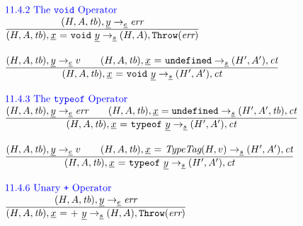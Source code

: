 \documentclass[a4paper, leqno]{amsart}
\newcommand{\rulesep}{\quad\quad}
\newcommand{\stmt}{s}
\newcommand{\expr}{e}
\newcommand{\ir}[1]{\ensuremath{\underline{#1}}}
\newcommand{\irid}{\ir{x}}
\def\inblue{\color{blue}}
\newcommand{\undef}{{\tt undefined}}
\newcommand{\tb}{\emph{tb}}
\newcommand{\err}{\emph{err}}
\newcommand{\ct}{\emph{ct}}
\newcommand{\hf}[1]{\emph{#1}}
\newcommand{\error}{\ensuremath{{\tt Throw}(\err)}}
\newcommand{\state}{\ensuremath{(H,A,\tb)}}
\newcommand{\statep}{\ensuremath{(H',A',\tb)}}
\newcommand{\res}{\ensuremath{(H,A)}}
\newcommand{\resp}{\ensuremath{(H',A')}}
\newcommand{\evale}{\ensuremath{(H,A,\tb)}}
\def\inblue{\color{blue}}
\begin{document}
\[
\begin{array}{l@{~~}l@{~~}ll}

\mbox{\inblue 11.4.2 The {\tt void} Operator}\\

\frac{\begin{matrix}
\evale, \ir{y} \rightarrow_{\ir\expr} \err
\end{matrix}}{\begin{matrix}
\state, \irid \ {\tt =} \ {\tt void}\ \ir{y}
\rightarrow_{\ir\stmt}
\res, \error
\end{matrix}}
\\[2em]

\frac{\begin{matrix}
\evale, \ir{y} \rightarrow_{\ir\expr} v
\rulesep
\state, \irid \ {\tt =} \ \undef \rightarrow_{\ir\stmt}\resp, \ct
\end{matrix}}{\begin{matrix}
\state, \irid \ {\tt =} \ {\tt void}\ \ir{y}
\rightarrow_{\ir\stmt}
\resp, \ct
\end{matrix}}
\\[2em]


\mbox{\inblue 11.4.3 The {\tt typeof} Operator}\\

\frac{\begin{matrix}
\evale, \ir{y} \rightarrow_{\ir\expr} \err
\rulesep
\state, \ir{x}=\undef \rightarrow_{\ir\stmt} \statep, \ct
\end{matrix}}{\begin{matrix}
\state, \irid \ {\tt =} \ {\tt typeof}\ \ir{y}
\rightarrow_{\ir\stmt}
\resp, \ct
\end{matrix}}
\\[2em]

\frac{\begin{matrix}
\evale, \ir{y} \rightarrow_{\ir\expr} v
\rulesep
\state, \irid \ {\tt =} \ \hf{TypeTag}(H,v)
\rightarrow_{\ir\stmt}
\resp, \ct
\end{matrix}}{\begin{matrix}
\state, \irid \ {\tt =} \ {\tt typeof}\ \ir{y}
\rightarrow_{\ir\stmt}
\resp, \ct
\end{matrix}}
\\[2em]

\mbox{\inblue 11.4.6 Unary {\tt +} Operator}\\
\frac{\begin{matrix}
\evale, \ir{y} \rightarrow_{\ir\expr} \err
\end{matrix}}{\begin{matrix}
\state, \irid \ {\tt =} \ {\tt +}\ \ir{y}
\rightarrow_{\ir\stmt}
\res, \error
\end{matrix}}
\\[2em]


\end{array}\]
\end{document}
